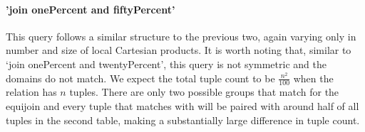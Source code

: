 \paragraph{'join onePercent and fiftyPercent'} This query follows a similar
structure to the previous two, again varying only in number and size of local
Cartesian products. It is worth noting that, similar to `join onePercent and
twentyPercent', this query is not symmetric and the domains do not match. We
expect the total tuple count to be $\frac{n^2}{100}$ when the
 relation has $n$ tuples. There are only two possible groups
that match for the equijoin and every tuple that matches with
 will be paired with around half of all tuples in
the second table, making a substantially large difference in tuple count.
